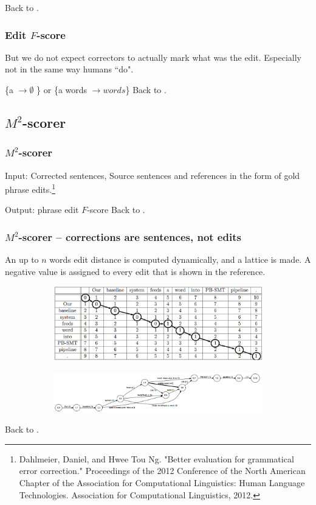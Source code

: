 \documentclass{beamer}
\begin{document}
\begin{frame}
\begin{figure}[b]
\begin{subfigure}{.5\textwidth}
		\end{subfigure}
	\end{figure}
	\small Back to \hyperlink{RBM}{}.
\end{frame}

\begin{frame}
	\frametitle{Edit $F$-score}
	But we do not expect correctors to actually mark what was the edit. Especially not in the same way humans ``do".
	
	\small \{a $\rightarrow \emptyset$ \} or \{a words $\rightarrow words$\}
	\small Back to \hyperlink{RBM}{}.
\end{frame}

\subsection{$M^2$-scorer}
\begin{frame}[label=m2]
	\frametitle{$M^2$-scorer}
	Input: Corrected sentences, Source sentences and references in the form of gold phrase edits.\footnote{\tiny Dahlmeier, Daniel, and Hwee Tou Ng. "Better evaluation for grammatical error correction." Proceedings of the 2012 Conference of the North American Chapter of the Association for Computational Linguistics: Human Language Technologies. Association for Computational Linguistics, 2012.}
	
	Output: phrase edit $F$-score
	\small Back to \hyperlink{RBM}{}.
\end{frame}

\begin{frame}
	\frametitle{$M^2$-scorer -- corrections are sentences, not edits}
	An up to $n$ words edit distance is computed dynamically, and a lattice is made. A negative value is assigned to every edit that is shown in the reference.
	\begin{figure}[b]
		\centering
		\begin{subfigure}{.8\textwidth}
			\includegraphics[width=\linewidth]{lattice}
		\end{subfigure}
		
		\begin{subfigure}{\textwidth}
			\includegraphics[width=\linewidth]{paths}
		\end{subfigure}
	\end{figure}
	\small Back to \hyperlink{RBM}{}.
\end{frame}
\end{document}
